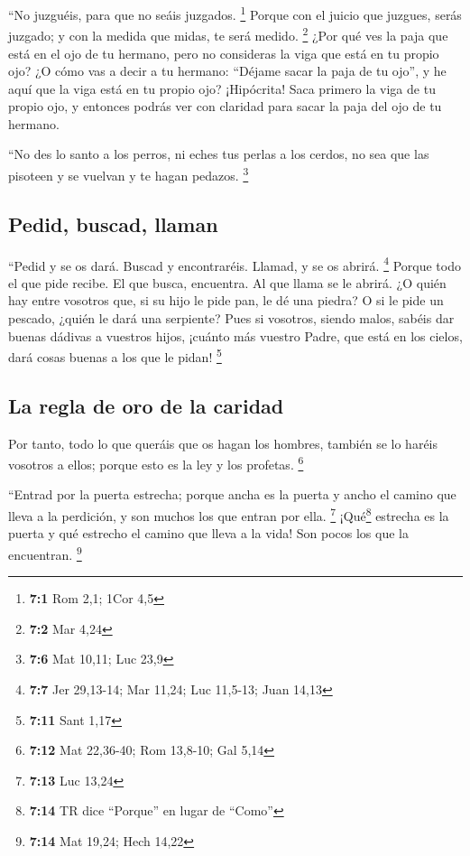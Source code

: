  ``No juzguéis, para que no seáis juzgados. \footnote{\textbf{7:1}
  Rom 2,1; 1Cor 4,5}  Porque con el juicio que juzgues,
serás juzgado; y con la medida que midas, te será medido. \footnote{\textbf{7:2}
  Mar 4,24}  ¿Por qué ves la paja que está en el ojo de tu
hermano, pero no consideras la viga que está en tu propio ojo?
 ¿O cómo vas a decir a tu hermano: ``Déjame sacar la paja
de tu ojo'', y he aquí que la viga está en tu propio ojo? 
¡Hipócrita! Saca primero la viga de tu propio ojo, y entonces podrás ver
con claridad para sacar la paja del ojo de tu hermano.

 ``No des lo santo a los perros, ni eches tus perlas a los
cerdos, no sea que las pisoteen y se vuelvan y te hagan pedazos.
\footnote{\textbf{7:6} Mat 10,11; Luc 23,9}

\hypertarget{pedid-buscad-llaman}{%
\subsection{Pedid, buscad, llaman}\label{pedid-buscad-llaman}}

 ``Pedid y se os dará. Buscad y encontraréis. Llamad, y se
os abrirá. \footnote{\textbf{7:7} Jer 29,13-14; Mar 11,24; Luc 11,5-13;
  Juan 14,13}  Porque todo el que pide recibe. El que
busca, encuentra. Al que llama se le abrirá.  ¿O quién hay
entre vosotros que, si su hijo le pide pan, le dé una piedra?
 O si le pide un pescado, ¿quién le dará una serpiente?
 Pues si vosotros, siendo malos, sabéis dar buenas
dádivas a vuestros hijos, ¡cuánto más vuestro Padre, que está en los
cielos, dará cosas buenas a los que le pidan! \footnote{\textbf{7:11}
  Sant 1,17}

\hypertarget{la-regla-de-oro-de-la-caridad}{%
\subsection{La regla de oro de la
caridad}\label{la-regla-de-oro-de-la-caridad}}

 Por tanto, todo lo que queráis que os hagan los hombres,
también se lo haréis vosotros a ellos; porque esto es la ley y los
profetas. \footnote{\textbf{7:12} Mat 22,36-40; Rom 13,8-10; Gal 5,14}

 ``Entrad por la puerta estrecha; porque ancha es la
puerta y ancho el camino que lleva a la perdición, y son muchos los que
entran por ella. \footnote{\textbf{7:13} Luc 13,24} 
¡Qué\footnote{\textbf{7:14} TR dice ``Porque'' en lugar de ``Como''}
estrecha es la puerta y qué estrecho el camino que lleva a la vida! Son
pocos los que la encuentran. \footnote{\textbf{7:14} Mat 19,24; Hech
  14,22}

